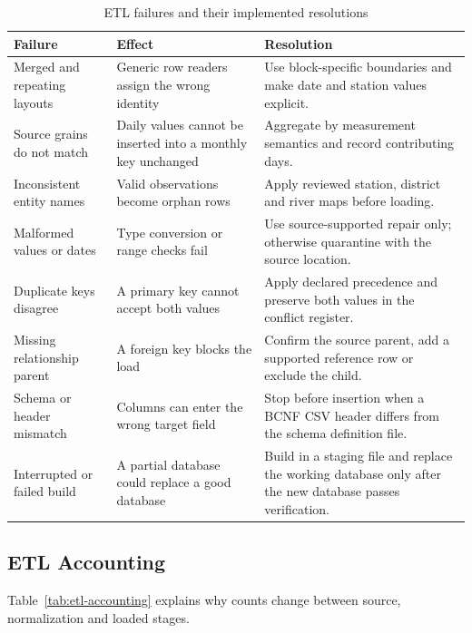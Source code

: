 \begin{table}[H]
\centering
\caption{ETL failures and their implemented resolutions}
\label{tab:etl-failures}
\begin{tabular}{L{0.24\textwidth}L{0.29\textwidth}L{0.37\textwidth}}
\toprule
Failure & Effect & Resolution \\
\midrule
Merged and repeating layouts & Generic row readers assign the wrong identity &
Use block-specific boundaries and make date and station values explicit. \\
Source grains do not match & Daily values cannot be inserted into a monthly
key unchanged & Aggregate by measurement semantics and record contributing
days. \\
Inconsistent entity names & Valid observations become orphan rows & Apply
reviewed station, district and river maps before loading. \\
Malformed values or dates & Type conversion or range checks fail & Use
source-supported repair only; otherwise quarantine with the source location. \\
Duplicate keys disagree & A primary key cannot accept both values & Apply
declared precedence and preserve both values in the conflict register. \\
Missing relationship parent & A foreign key blocks the load & Confirm the
source parent, add a supported reference row or exclude the child. \\
Schema or header mismatch & Columns can enter the wrong target field & Stop before
insertion when a BCNF CSV header differs from the schema definition file. \\
Interrupted or failed build & A partial database could replace a good database &
Build in a staging file and replace the working database only after the new
database passes verification. \\
\bottomrule
\end{tabular}
\end{table}

\subsection{ETL Accounting}
\label{subsec:etl-accounting}

Table~\ref{tab:etl-accounting} explains why counts change between source,
normalization and loaded stages.


